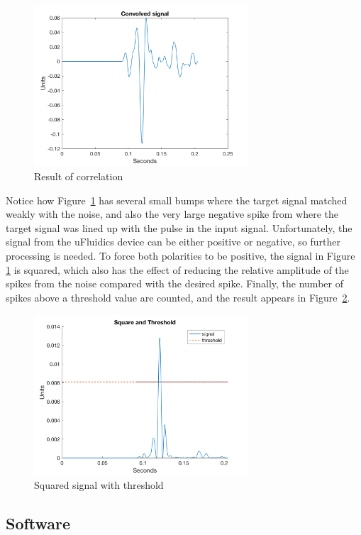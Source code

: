 \documentclass[10pt, journal]{IEEEtran}
\begin{document}
\begin{figure}[h]
  \includegraphics[width=8cm]{../matlab/plot3.png}
  \caption{Result of correlation}
  \label{fig:correl}
\end{figure}

Notice how Figure \,\ref{fig:correl} has several small bumps where the
target signal matched weakly with the noise, and also the very large
negative spike from where the target signal was lined up with the
pulse in the input signal. Unfortunately, the signal from the
uFluidics device can be either positive or negative, so further
processing is needed. To force both polarities to be positive, the
signal in Figure \,\ref{fig:correl} is squared, which also has the
effect of reducing the relative amplitude of the spikes from the noise
compared with the desired spike. Finally, the number of spikes above a
threshold value are counted, and the result appears in Figure
\,\ref{fig:result}.

\begin{figure}[h]
  \includegraphics[width=8cm]{../matlab/plot4.png}
  \caption{Squared signal with threshold}
  \label{fig:result}
\end{figure}

\subsection{Software}
\end{document}
